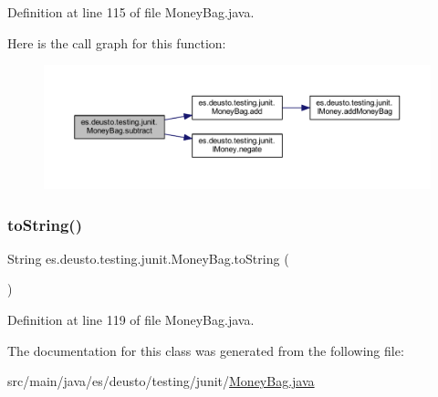 Definition at line 115 of file Money\+Bag.\+java.

Here is the call graph for this function\+:
\nopagebreak
\begin{figure}[H]
\begin{center}
\leavevmode
\includegraphics[width=350pt]{classes_1_1deusto_1_1testing_1_1junit_1_1_money_bag_a7f1803fe267edca895cdf752b5f46560_cgraph}
\end{center}
\end{figure}
\mbox{\label{classes_1_1deusto_1_1testing_1_1junit_1_1_money_bag_a85b49bdc3ff191abdaa1ad1a065ec5f1}} 
\subsubsection{\texorpdfstring{toString()}{toString()}}
{\footnotesize\ttfamily String es.\+deusto.\+testing.\+junit.\+Money\+Bag.\+to\+String (\begin{DoxyParamCaption}{ }\end{DoxyParamCaption})}



Definition at line 119 of file Money\+Bag.\+java.



The documentation for this class was generated from the following file\+:\begin{DoxyCompactItemize}
\item 
src/main/java/es/deusto/testing/junit/\mbox{\hyperlink{_money_bag_8java}{Money\+Bag.\+java}}\end{DoxyCompactItemize}
